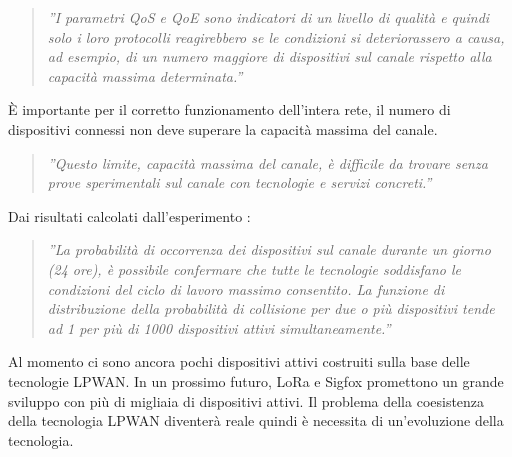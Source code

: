 \documentclass[a4paper]{report} %
\begin{document}
\begin{quote}
	\textit{''I parametri QoS e QoE sono indicatori di un livello di qualità e quindi solo i loro protocolli reagirebbero se le condizioni si deteriorassero a causa, ad esempio, di un numero maggiore di dispositivi sul canale rispetto alla capacità massima determinata.''}
\end{quote}
È importante per il corretto funzionamento dell'intera rete, il numero di dispositivi connessi non deve superare la capacità massima del canale. 
\begin{quote}
	\textit{''Questo limite, capacità massima del canale, è difficile da trovare senza prove sperimentali sul canale con tecnologie e servizi concreti.''}
\end{quote}
Dai risultati calcolati dall'esperimento \cite{art:rif.46}:
\begin{quote}
	\textit{''La probabilità di occorrenza dei dispositivi sul canale durante un giorno (24 ore), è possibile confermare che tutte le tecnologie soddisfano le condizioni del ciclo di lavoro massimo consentito. La funzione di distribuzione della probabilità di collisione per due o più dispositivi tende ad 1 per più di 1000 dispositivi attivi simultaneamente.''}
\end{quote}  
Al momento ci sono ancora pochi dispositivi attivi costruiti sulla base delle tecnologie LPWAN. In un prossimo futuro, LoRa e Sigfox promettono un grande sviluppo con più di migliaia di dispositivi attivi. Il problema della coesistenza della tecnologia LPWAN diventerà reale quindi è necessita di un'evoluzione della tecnologia.
\end{document}
